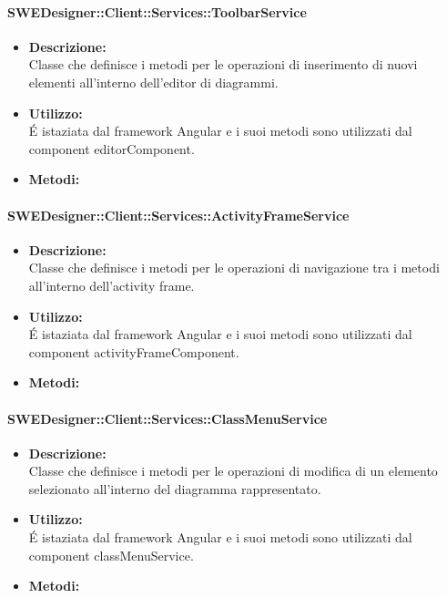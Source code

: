           	\paragraph{SWEDesigner::Client::Services::ToolbarService}
				\begin{itemize}
          			\item \textbf{Descrizione:}\\
          			Classe che definisce i metodi per le operazioni di inserimento di nuovi elementi all’interno dell’editor di diagrammi.
          			\item \textbf{Utilizzo:}\\
          			É istaziata dal framework Angular e i suoi metodi sono utilizzati dal component editorComponent.
          			\item \textbf{Metodi:}\\
          		\end{itemize}
          	\paragraph{SWEDesigner::Client::Services::ActivityFrameService}
				\begin{itemize}
          			\item \textbf{Descrizione:}\\
          			Classe che definisce i metodi per le operazioni di navigazione tra i metodi all’interno dell’activity frame.
          			\item \textbf{Utilizzo:}\\
          			É istaziata dal framework Angular e i suoi metodi sono utilizzati dal component activityFrameComponent.
          			\item \textbf{Metodi:}\\
          		\end{itemize}
          	\paragraph{SWEDesigner::Client::Services::ClassMenuService}
				\begin{itemize}
          			\item \textbf{Descrizione:}\\
          			Classe che definisce i metodi per le operazioni di modifica di un elemento selezionato all’interno del diagramma rappresentato.
          			\item \textbf{Utilizzo:}\\
          			É istaziata dal framework Angular e i suoi metodi sono utilizzati dal component classMenuService.
          			\item \textbf{Metodi:}\\
          		\end{itemize}
